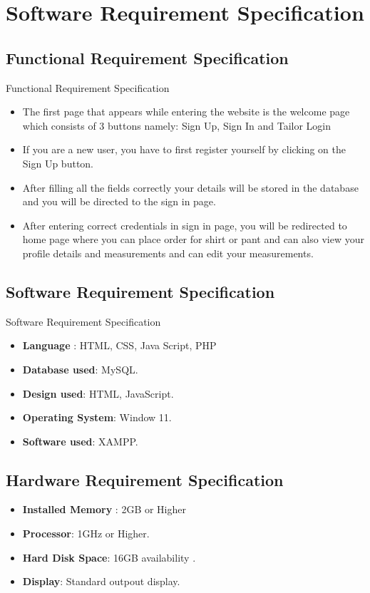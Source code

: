 \documentclass[12pt, letter paper]{report}
\begin{document}
{\begin{spacing}{1.5}
\begin{itemize}
\end{itemize}
\end{spacing}
\chapter{Software Requirement Specification}

\section{Functional Requirement Specification} 
Functional  Requirement Specification
\begin{itemize}
\item The first page that appears while entering the website is the welcome page which consists of 3 buttons namely: Sign Up, Sign In and Tailor Login
\item If you are a new user, you have to first register yourself by clicking on the Sign Up button.
\item After filling all the fields correctly your details will be stored in the database and you will be directed to the sign in page. 
\item After entering correct credentials in sign in page, you will be redirected to home page where you can place order for shirt or pant and can also view your profile details and measurements and can edit your measurements.
\end{itemize}
\section{Software Requirement Specification}
Software Requirement Specification
\begin{itemize}
 \item {\textbf{Language} : HTML, CSS, Java Script, PHP}
 \item {\textbf{Database used}: MySQL}.
 \item {\textbf{Design used}: HTML, JavaScript}.
 \item {\textbf{Operating System}: Window 11}.
 \item {\textbf{Software used}: XAMPP}.
\end{itemize}

\section{Hardware Requirement Specification} 

\begin{itemize}
 \item {\textbf{Installed Memory} : 2GB or Higher}
 \item {\textbf{Processor}: 1GHz or Higher}.
 \item {\textbf{Hard Disk Space}: 16GB availability }.
 \item {\textbf{Display}: Standard outpout display}.
 \
\end{itemize}
}
\end{document}
